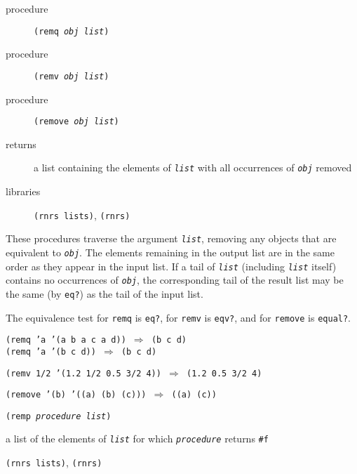 \begin{description}

\label{objects_s53}\item[procedure] \texttt{(remq \textit{obj} \textit{list})}



\item[procedure] \texttt{(remv \textit{obj} \textit{list})}



\item[procedure] \texttt{(remove \textit{obj} \textit{list})}



\item[returns] a list containing the elements of \texttt{\textit{list}} with all occurrences of \texttt{\textit{obj}} removed


\item[libraries] \texttt{(rnrs lists)}, \texttt{(rnrs)}
\end{description}


These procedures traverse the argument \texttt{\textit{list}}, removing any objects
that are equivalent to \texttt{\textit{obj}}.
The elements remaining in the output list are in the same order as they appear
in the input list.
If a tail of \texttt{\textit{list}} (including \texttt{\textit{list}} itself) contains no occurrences of 
\texttt{\textit{obj}}, the corresponding tail of the result list may be the same
(by \texttt{eq?}) as the tail of the input list.


The equivalence test for \texttt{remq} is \texttt{eq?},
for \texttt{remv} is \texttt{eqv?},
and for \texttt{remove} is \texttt{equal?}.


\begin{alltt}
(remq 'a '(a b a c a d)) \(\Rightarrow\) (b c d)
(remq 'a '(b c d)) \(\Rightarrow\) (b c d)

(remv 1/2 '(1.2 1/2 0.5 3/2 4)) \(\Rightarrow\) (1.2 0.5 3/2 4)

(remove '(b) '((a) (b) (c))) \(\Rightarrow\) ((a) (c))
\end{alltt}

\begin{description}

\label{objects_s54}\item[procedure] \texttt{(remp \textit{procedure} \textit{list})}



\item[returns] a list of the elements of \texttt{\textit{list}} for which \texttt{\textit{procedure}} returns \texttt{\#{}f}


\item[libraries] \texttt{(rnrs lists)}, \texttt{(rnrs)}
\end{description}

